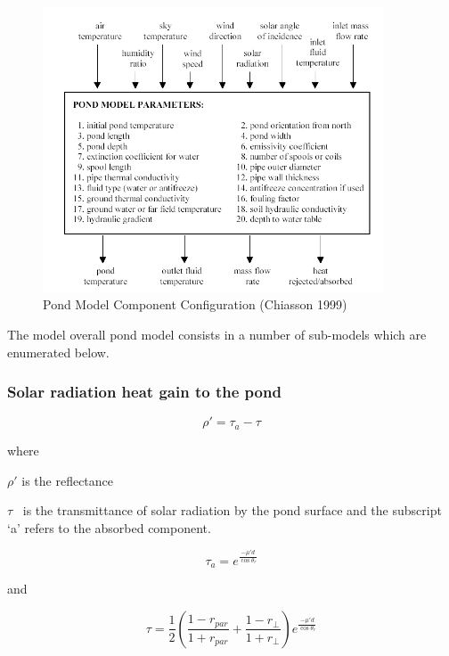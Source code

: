\begin{figure}[hbtp] %
\centering
\includegraphics[width=0.9\textwidth, height=0.9\textheight, keepaspectratio=true]{media/image5686.png}
\caption{Pond Model Component Configuration (Chiasson 1999) \protect \label{fig:pond-model-component-configuration-chiasson}}
\end{figure}

The model overall pond model consists in a number of sub-models which are enumerated below.

\subsubsection{Solar radiation heat gain to the pond}\label{solar-radiation-heat-gain-to-the-pond}

\begin{equation}
\rho ' = {\tau_a} - \tau
\end{equation}

where

\(\rho '\) is the reflectance

\(\tau\) ~is the transmittance of solar radiation by the pond surface and the subscript `a' refers to the absorbed component.

\begin{equation}
{\tau_a} = {e^{\frac{{ - \mu 'd}}{{\cos {\theta_r}}}}}
\end{equation}

and

\begin{equation}
\tau  = \frac{1}{2}\left( {\frac{{1 - {r_{par}}}}{{1 + {r_{par}}}} + \frac{{1 - {r_ \bot }}}{{1 + {r_ \bot }}}} \right){e^{\frac{{ - \mu 'd}}{{\cos {\theta_r}}}}}
\end{equation}

